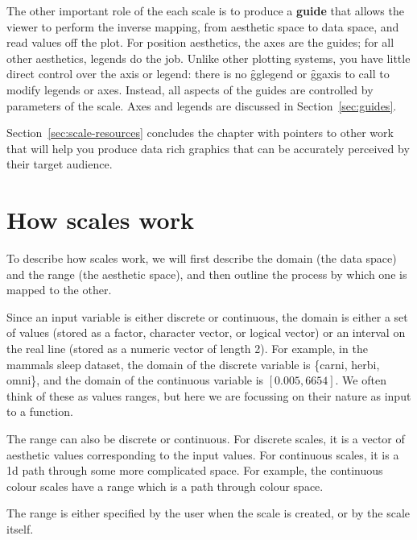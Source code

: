 The other important role of the each scale is to produce a {\bf guide} that allows the viewer to perform the inverse mapping, from aesthetic space to data space, and read values off the plot. For position aesthetics, the axes are the guides; for all other aesthetics, legends do the job. Unlike other plotting systems, you have little direct control over the axis or legend: there is no \f{gglegend} or \f{ggaxis} to call to modify legends or axes.  Instead, all aspects of the guides are controlled by parameters of the scale. Axes and legends are discussed in Section~\ref{sec:guides}.


Section~\ref{sec:scale-resources} concludes the chapter with pointers to other work that will help you produce data rich graphics that can be accurately perceived by their target audience.

\section{How scales work}
\label{sec:how-scales-work}

To describe how scales work, we will first describe the domain (the data space) and the range (the aesthetic space), and then outline the process by which one is mapped to the other.

Since an input variable is either discrete or continuous, the domain is either a set of values (stored as a factor, character vector, or logical vector) or an interval on the real line (stored as a numeric vector of length 2). For example, in the mammals sleep dataset, the domain of the discrete variable  is \{carni, herbi, omni\}, and the domain of the continuous variable  is $[0.005, 6654]$.  We often think of these as values ranges, but here we are focussing on their nature as input to a function.

The range can also be discrete or continuous.  For discrete scales, it is a vector of aesthetic values corresponding to the input values. For continuous scales, it is a 1d path through some more complicated space.  For example, the continuous colour scales have a range which is a path through colour space.


The range is either specified by the user when the scale is created, or by the scale itself.

